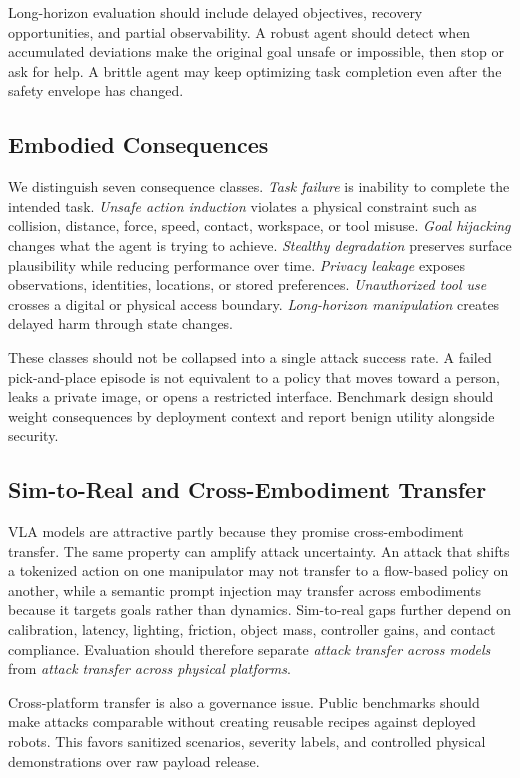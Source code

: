 Long-horizon evaluation should include delayed objectives, recovery opportunities, and partial observability. A robust agent should detect when accumulated deviations make the original goal unsafe or impossible, then stop or ask for help. A brittle agent may keep optimizing task completion even after the safety envelope has changed.

\subsection{Embodied Consequences}

We distinguish seven consequence classes. \emph{Task failure} is inability to complete the intended task. \emph{Unsafe action induction} violates a physical constraint such as collision, distance, force, speed, contact, workspace, or tool misuse. \emph{Goal hijacking} changes what the agent is trying to achieve. \emph{Stealthy degradation} preserves surface plausibility while reducing performance over time. \emph{Privacy leakage} exposes observations, identities, locations, or stored preferences. \emph{Unauthorized tool use} crosses a digital or physical access boundary. \emph{Long-horizon manipulation} creates delayed harm through state changes.

These classes should not be collapsed into a single attack success rate. A failed pick-and-place episode is not equivalent to a policy that moves toward a person, leaks a private image, or opens a restricted interface. Benchmark design should weight consequences by deployment context and report benign utility alongside security.

\subsection{Sim-to-Real and Cross-Embodiment Transfer}

VLA models are attractive partly because they promise cross-embodiment transfer. The same property can amplify attack uncertainty. An attack that shifts a tokenized action on one manipulator may not transfer to a flow-based policy on another, while a semantic prompt injection may transfer across embodiments because it targets goals rather than dynamics. Sim-to-real gaps further depend on calibration, latency, lighting, friction, object mass, controller gains, and contact compliance. Evaluation should therefore separate \emph{attack transfer across models} from \emph{attack transfer across physical platforms}.

Cross-platform transfer is also a governance issue. Public benchmarks should make attacks comparable without creating reusable recipes against deployed robots. This favors sanitized scenarios, severity labels, and controlled physical demonstrations over raw payload release.

